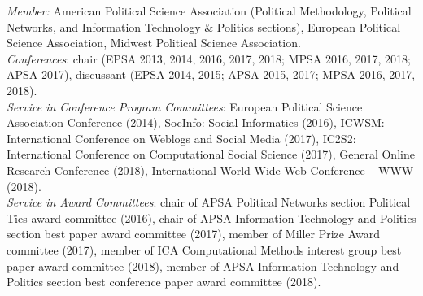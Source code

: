 \documentclass[margin,line,11pt]{resume}
\newcommand{\nl}{\vspace{0.10in}\\}
\begin{document}
\begin{resume}
\emph{Member:} American Political Science Association (Political Methodology, Political Networks, and Information Technology \& Politics sections), European Political Science Association, Midwest Political Science Association.\nl
\emph{Conferences}: chair (EPSA 2013, 2014, 2016, 2017, 2018; MPSA 2016, 2017, 2018; APSA 2017), discussant (EPSA 2014, 2015; APSA 2015, 2017; MPSA 2016, 2017, 2018).\nl
\emph{Service in Conference Program Committees}: European Political Science Association Conference (2014), SocInfo: Social Informatics (2016), ICWSM: International Conference on Weblogs and Social Media (2017), IC2S2: International Conference on Computational Social Science (2017), General Online Research Conference (2018),  International World Wide Web Conference
-- WWW (2018).\nl
\emph{Service in Award Committees}: chair of APSA Political Networks section Political Ties award committee (2016), chair of APSA Information Technology and Politics section best paper award committee (2017), member of Miller Prize Award committee (2017), member of ICA Computational Methods interest group best paper award committee (2018), member of APSA Information Technology and Politics section best conference paper award committee (2018).

\end{resume}
\end{document}
